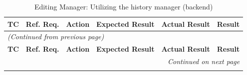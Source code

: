\documentclass[12pt, titlepage]{article}
\begin{document}
\begin{longtable}{c
    >{\raggedright\arraybackslash}p{1.5cm}
    >{\raggedright\arraybackslash}p{3cm}
    >{\raggedright\arraybackslash}p{3cm}
  >{\raggedright\arraybackslash}p{4.5cm} c}
  \caption{Editing Manager: Utilizing the history manager (backend)}
  \label{table:em_history_tests} \\
  \toprule
  \textbf{TC} & \textbf{Ref. Req.} & \textbf{Action} &
  \textbf{Expected Result} & \textbf{Actual Result} & \textbf{Result} \\
  \midrule
  \endfirsthead

  \multicolumn{6}{l}{\textit{(Continued from previous page)}} \\
  \toprule
  \textbf{TC} & \textbf{Ref. Req.} & \textbf{Action} &
  \textbf{Expected Result} & \textbf{Actual Result} & \textbf{Result} \\
  \midrule
  \endhead

  \multicolumn{6}{r}{\textit{Continued on next page}} \\
  \endfoot

  \bottomrule
  \endlastfoot


\end{longtable}
\end{document}
